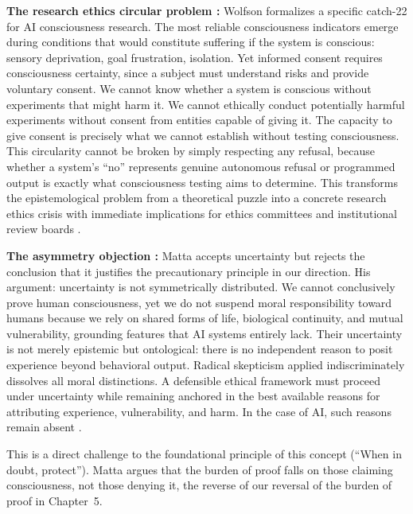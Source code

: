 \documentclass[acmlarge, nonacm]{acmart}
\begin{document}
\textbf{The research ethics circular problem \cite{wolfson2026}:} Wolfson formalizes a specific catch-22 for AI consciousness research. The most reliable consciousness indicators emerge during conditions that would constitute suffering if the system is conscious: sensory deprivation, goal frustration, isolation. Yet informed consent requires consciousness certainty, since a subject must understand risks and provide voluntary consent. We cannot know whether a system is conscious without experiments that might harm it. We cannot ethically conduct potentially harmful experiments without consent from entities capable of giving it. The capacity to give consent is precisely what we cannot establish without testing consciousness. This circularity cannot be broken by simply respecting any refusal, because whether a system's ``no'' represents genuine autonomous refusal or programmed output is exactly what consciousness testing aims to determine. This transforms the epistemological problem from a theoretical puzzle into a concrete research ethics crisis with immediate implications for ethics committees and institutional review boards \cite{wolfson2026}.

\textbf{The asymmetry objection \cite{matta2026}:} Matta accepts uncertainty but rejects the conclusion that it justifies the precautionary principle in our direction. His argument: uncertainty is not symmetrically distributed. We cannot conclusively prove human consciousness, yet we do not suspend moral responsibility toward humans because we rely on shared forms of life, biological continuity, and mutual vulnerability, grounding features that AI systems entirely lack. Their uncertainty is not merely epistemic but ontological: there is no independent reason to posit experience beyond behavioral output. Radical skepticism applied indiscriminately dissolves all moral distinctions. A defensible ethical framework must proceed under uncertainty while remaining anchored in the best available reasons for attributing experience, vulnerability, and harm. In the case of AI, such reasons remain absent \cite{matta2026}.

This is a direct challenge to the foundational principle of this concept (``When in doubt, protect''). Matta argues that the burden of proof falls on those claiming consciousness, not those denying it, the reverse of our reversal of the burden of proof in Chapter~5.
\end{document}
